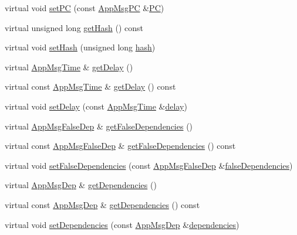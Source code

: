 \begin{DoxyCompactItemize}
\item 
virtual void \hyperlink{class_app_msg_a36ed2ccb047c20c26292687c44acd79b}{set\+PC} (const \hyperlink{_app_msg__m_8h_abcd76636e4b750d033ffc348601dd7a2}{App\+Msg\+PC} \&\hyperlink{class_app_msg_a0dceb6642736a90673422df92ab3d788}{PC})
\item 
virtual unsigned long \hyperlink{class_app_msg_a59f818e49bf28c2fd494e6668ef13367}{get\+Hash} () const
\item 
virtual void \hyperlink{class_app_msg_afd406d5bf0b92892a1ebf8fe3397331a}{set\+Hash} (unsigned long \hyperlink{class_app_msg_a8b73e331d42d97d9e51603dc5352307f}{hash})
\item 
virtual \hyperlink{_app_msg__m_8h_afd955b091e7d9b98cff80a090db1eb09}{App\+Msg\+Time} \& \hyperlink{class_app_msg_aa45e97cdd014921d271665e856c642cc}{get\+Delay} ()
\item 
virtual const \hyperlink{_app_msg__m_8h_afd955b091e7d9b98cff80a090db1eb09}{App\+Msg\+Time} \& \hyperlink{class_app_msg_ac735d5e96a9c7fe0281d617820d7b533}{get\+Delay} () const
\item 
virtual void \hyperlink{class_app_msg_a81ed720c6233e90a97ab0dd928be6574}{set\+Delay} (const \hyperlink{_app_msg__m_8h_afd955b091e7d9b98cff80a090db1eb09}{App\+Msg\+Time} \&\hyperlink{class_app_msg_af7a10648a9051ad068c0b2660c7bb545}{delay})
\item 
virtual \hyperlink{_app_msg__m_8h_a2b8cadfd13c916ddccf5a213ca34d8ee}{App\+Msg\+False\+Dep} \& \hyperlink{class_app_msg_a0578104e6c8983ba88270192b263e3c9}{get\+False\+Dependencies} ()
\item 
virtual const \hyperlink{_app_msg__m_8h_a2b8cadfd13c916ddccf5a213ca34d8ee}{App\+Msg\+False\+Dep} \& \hyperlink{class_app_msg_aa9c4237b7fafc07ee9ba6d798941cc06}{get\+False\+Dependencies} () const
\item 
virtual void \hyperlink{class_app_msg_ab810112cdc978f6c93b2d45e4aa6f094}{set\+False\+Dependencies} (const \hyperlink{_app_msg__m_8h_a2b8cadfd13c916ddccf5a213ca34d8ee}{App\+Msg\+False\+Dep} \&\hyperlink{class_app_msg_a2e1c93236ae4ceb0fc5571a5b044c454}{false\+Dependencies})
\item 
virtual \hyperlink{_app_msg__m_8h_a39bb58326d7e24febcd7397c022ada6a}{App\+Msg\+Dep} \& \hyperlink{class_app_msg_ae767d2a50a7b279bdecf457fd047125a}{get\+Dependencies} ()
\item 
virtual const \hyperlink{_app_msg__m_8h_a39bb58326d7e24febcd7397c022ada6a}{App\+Msg\+Dep} \& \hyperlink{class_app_msg_a453ca3d6502f7f82020c7ef2787a45c7}{get\+Dependencies} () const
\item 
virtual void \hyperlink{class_app_msg_a1f648f7d16c4f3329fffb6b4e73e969c}{set\+Dependencies} (const \hyperlink{_app_msg__m_8h_a39bb58326d7e24febcd7397c022ada6a}{App\+Msg\+Dep} \&\hyperlink{class_app_msg_a6f78bb134b9a39321ad8093da19d8c8b}{dependencies})
\end{DoxyCompactItemize}
